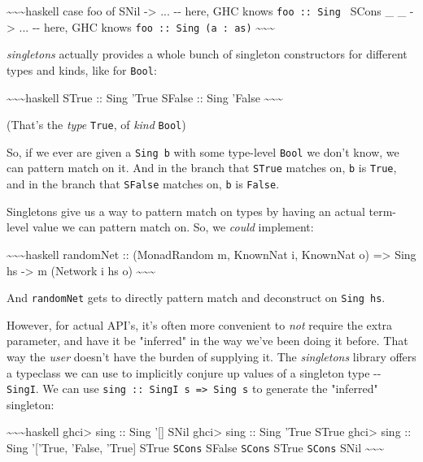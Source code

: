 \documentclass[]{article}
\begin{document}
\textasciitilde{}\textasciitilde{}\textasciitilde{}haskell case foo of SNil
-\textgreater{} ... -\/- here, GHC knows
\texttt{foo\ ::\ Sing\ \textquotesingle{}{[}{]}} SCons \_ \_ -\textgreater{} ...
-\/- here, GHC knows \texttt{foo\ ::\ Sing\ (a\ \textquotesingle{}:\ as)}
\textasciitilde{}\textasciitilde{}\textasciitilde{}

\emph{singletons} actually provides a whole bunch of singleton constructors for
different types and kinds, like for \texttt{Bool}:

\textasciitilde{}\textasciitilde{}\textasciitilde{}haskell STrue :: Sing 'True
SFalse :: Sing 'False \textasciitilde{}\textasciitilde{}\textasciitilde{}

(That's the \emph{type} \texttt{\textquotesingle{}True}, of \emph{kind}
\texttt{Bool})

So, if we ever are given a \texttt{Sing\ b} with some type-level \texttt{Bool}
we don't know, we can pattern match on it. And in the branch that \texttt{STrue}
matches on, \texttt{b} is \texttt{\textquotesingle{}True}, and in the branch
that \texttt{SFalse} matches on, \texttt{b} is \texttt{False}.

Singletons give us a way to pattern match on types by having an actual
term-level value we can pattern match on. So, we \emph{could} implement:

\textasciitilde{}\textasciitilde{}\textasciitilde{}haskell randomNet ::
(MonadRandom m, KnownNat i, KnownNat o) =\textgreater{} Sing hs -\textgreater{}
m (Network i hs o) \textasciitilde{}\textasciitilde{}\textasciitilde{}

And \texttt{randomNet} gets to directly pattern match and deconstruct on
\texttt{Sing\ hs}.

However, for actual API's, it's often more convenient to \emph{not} require the
extra parameter, and have it be "inferred" in the way we've been doing it
before. That way the \emph{user} doesn't have the burden of supplying it. The
\emph{singletons} library offers a typeclass we can use to implicitly conjure up
values of a singleton type -\/- \texttt{SingI}. We can use
\texttt{sing\ ::\ SingI\ s\ =\textgreater{}\ Sing\ s} to generate the "inferred"
singleton:

\textasciitilde{}\textasciitilde{}\textasciitilde{}haskell ghci\textgreater{}
sing :: Sing '{[}{]} SNil ghci\textgreater{} sing :: Sing 'True STrue
ghci\textgreater{} sing :: Sing '{[}'True, 'False, 'True{]} STrue \texttt{SCons}
SFalse \texttt{SCons} STrue \texttt{SCons} SNil
\textasciitilde{}\textasciitilde{}\textasciitilde{}
\end{document}
